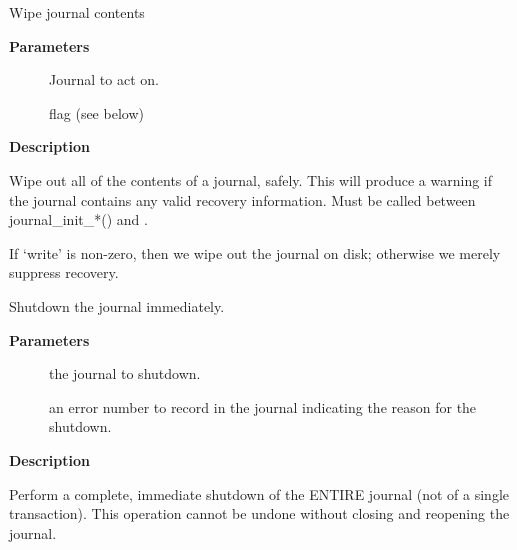\documentclass[a4paper,8pt,english]{sphinxmanual}
\begin{document}
\begin{fulllineitems}
\label{filesystems/index:c.jbd2_journal_wipe}
Wipe journal contents

\end{fulllineitems}


\textbf{Parameters}
\begin{description}
\item[{}] \leavevmode
Journal to act on.

\item[{}] \leavevmode
flag (see below)

\end{description}

\textbf{Description}

Wipe out all of the contents of a journal, safely.  This will produce
a warning if the journal contains any valid recovery information.
Must be called between journal\_init\_*() and {\hyperref[filesystems/index:c.jbd2_journal_load]{\emph{}}}.

If `write' is non-zero, then we wipe out the journal on disk; otherwise
we merely suppress recovery.

\begin{fulllineitems}
\label{filesystems/index:c.jbd2_journal_abort}
Shutdown the journal immediately.

\end{fulllineitems}


\textbf{Parameters}
\begin{description}
\item[{}] \leavevmode
the journal to shutdown.

\item[{}] \leavevmode
an error number to record in the journal indicating
the reason for the shutdown.

\end{description}

\textbf{Description}

Perform a complete, immediate shutdown of the ENTIRE
journal (not of a single transaction).  This operation cannot be
undone without closing and reopening the journal.
\end{document}
